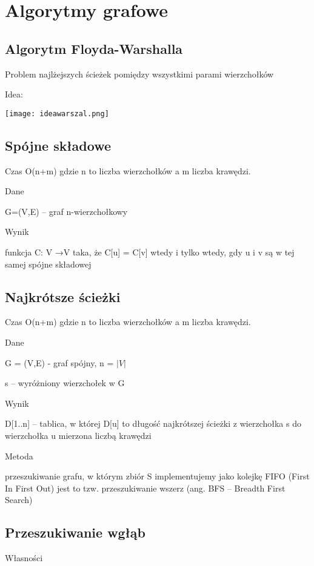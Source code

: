 \section{Algorytmy grafowe}

\subsection{Algorytm Floyda-Warshalla}

\entry
Problem najlżejszych ścieżek pomiędzy wszystkimi
parami wierzchołków

\entry 
Idea:

\texttt{[image: ideawarszal.png]}

\subsection{Spójne składowe}

\entry
Czas O(n+m) gdzie n to liczba wierzchołków a m liczba krawędzi.

\entry 
Dane

G=(V,E) – graf n-wierzchołkowy

Wynik

funkcja C: V →V taka, że C[u] = C[v] wtedy i tylko wtedy, gdy u i v są w tej samej spójne składowej

\subsection{Najkrótsze ścieżki}

\entry 
Czas O(n+m) gdzie n to liczba wierzchołków a m liczba krawędzi.

\entry 
Dane

G = (V,E) - graf spójny, n = $|V|$

s – wyróżniony wierzchołek w G

Wynik

D[1..n] – tablica, w której D[u] to długość najkrótszej ścieżki z wierzchołka s do wierzchołka u mierzona liczbą krawędzi

Metoda

przeszukiwanie grafu, w którym zbiór S implementujemy jako kolejkę FIFO (First In First Out)
jest to tzw. przeszukiwanie wszerz (ang. BFS – Breadth First Search)

\subsection{Przeszukiwanie wgłąb}
\entry
Własności


